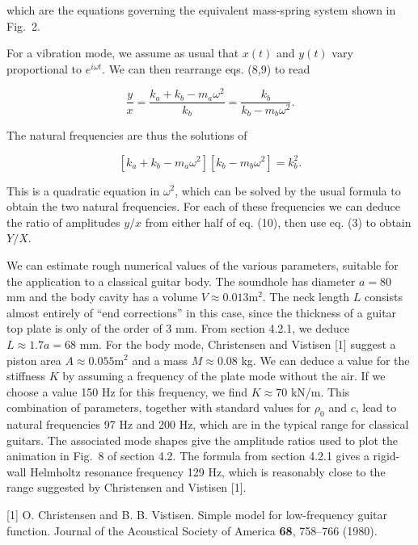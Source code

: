   which are the equations governing the equivalent mass-spring system shown in 
  Fig.\ 2. 


  For a vibration mode, we assume as usual that $x(t)$ and $y(t)$ vary 
  proportional to $e^{i \omega t}$. We can then rearrange eqs. (8,9) to read 

  $$\dfrac{y}{x}=\dfrac{k_a+k_b-m_a \omega^2}{k_b} = \dfrac{k_b}{k_b-m_b 
  \omega^2} . \tag{10}$$ 

  The natural frequencies are thus the solutions of 

  $$\left[ k_a+k_b-m_a \omega^2 \right] \left[ k_b-m_b \omega^2 \right] = k_b^2 
  . \tag{11}$$ 

  This is a quadratic equation in $\omega^2$, which can be solved by the usual 
  formula to obtain the two natural frequencies. For each of these frequencies 
  we can deduce the ratio of amplitudes $y/x$ from either half of eq. (10), 
  then use eq. (3) to obtain $Y/X$. 

  We can estimate rough numerical values of the various parameters, suitable 
  for the application to a classical guitar body. The soundhole has diameter 
  $a=80$ mm and the body cavity has a volume $V \approx 0.013 \mathrm{m}^2$. 
  The neck length $L$ consists almost entirely of ``end corrections'' in this 
  case, since the thickness of a guitar top plate is only of the order of 3 mm. 
  From section 4.2.1, we deduce $L \approx 1.7 a = 68$ mm. For the body mode, 
  Christensen and Vistisen [1] suggest a piston area $A \approx 0.055 
  \mathrm{m}^2$ and a mass $M \approx 0.08$ kg. We can deduce a value for the 
  stiffness $K$ by assuming a frequency of the plate mode without the air. If 
  we choose a value 150 Hz for this frequency, we find $K \approx 70$ kN/m. 
  This combination of parameters, together with standard values for $\rho_0$ 
  and $c$, lead to natural frequencies 97 Hz and 200 Hz, which are in the 
  typical range for classical guitars. The associated mode shapes give the 
  amplitude ratios used to plot the animation in Fig.\ 8 of section 4.2. The 
  formula from section 4.2.1 gives a rigid-wall Helmholtz resonance frequency 
  129 Hz, which is reasonably close to the range suggested by Christensen and 
  Vistisen [1]. 

  \sectionreferences{}[1] O. Christensen and B. B. Vistisen. Simple model for 
  low-frequency guitar function. Journal of the Acoustical Society of America 
  \textbf{68}, 758–766 (1980). 